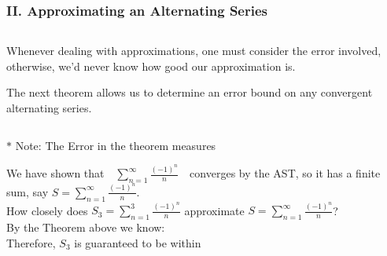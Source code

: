 \begin{frame}
\frametitle{II. Approximating an Alternating Series}
\scriptsize
\begin{columns}
\begin{column}{12.0cm}
	Whenever dealing with approximations, one must consider the error involved, otherwise, we'd never know how good our approximation is.  \\
	
	\vspace{0.1cm}
	
	The next theorem allows us to determine an error bound on any convergent alternating series.
	
	\vspace{0.2cm}
	
	\begin{columns}\begin{column}{0.0cm}\end{column}\end{columns}
	\vspace{0.2cm}
	$\ast$ Note: The Error in the theorem measures \onslide<2->{\textcolor{blue}{how far the partial sum is from the sum.}}
	
	\vspace{0.2cm}
	
	We have shown that \,\, $\sum \limits_{n=1}^{\infty} \frac{(-1)^{n}}{n}$ \,\, converges by the AST, so it has a finite sum, say $S = \sum \limits_{n=1}^{\infty} \frac{(-1)^{n}}{n}$.\\
	How closely does $S_3 = \sum \limits_{n=1}^{3} \frac{(-1)^{n}}{n}$ approximate $S = \sum \limits_{n=1}^{\infty} \frac{(-1)^{n}}{n}$? \\
	By the Theorem above we know: \quad {} \\
	\vspace{0.2cm}
	Therefore, $S_3$ is guaranteed to be within \onslide<4->{\textcolor{blue}{0.25 of the actual sum $S$.}}
\end{column}
\begin{column}{0.0cm}\end{column}
\end{columns}
\end{frame}


